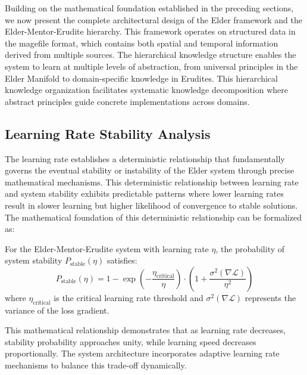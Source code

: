 Building on the mathematical foundation established in the preceding sections, we now present the complete architectural design of the Elder framework and the Elder-Mentor-Erudite hierarchy. This framework operates on structured data in the magefile format, which contains both spatial and temporal information derived from multiple sources. The hierarchical knowledge structure enables the system to learn at multiple levels of abstraction, from universal principles in the Elder Manifold to domain-specific knowledge in Erudites. This hierarchical knowledge organization facilitates systematic knowledge decomposition where abstract principles guide concrete implementations across domains.

\subsection{Learning Rate Stability Analysis}

The learning rate establishes a deterministic relationship that fundamentally governs the eventual stability or instability of the Elder system through precise mathematical mechanisms. This deterministic relationship between learning rate and system stability exhibits predictable patterns where lower learning rates result in slower learning but higher likelihood of convergence to stable solutions. The mathematical foundation of this deterministic relationship can be formalized as:

\begin{theorem}
For the Elder-Mentor-Erudite system with learning rate $\eta$, the probability of system stability $P_{\text{stable}}(\eta)$ satisfies:
\begin{equation}
P_{\text{stable}}(\eta) = 1 - \exp\left(-\frac{\eta_{\text{critical}}}{\eta}\right) \cdot \left(1 + \frac{\sigma^2(\nabla \mathcal{L})}{\eta^2}\right)
\end{equation}
where $\eta_{\text{critical}}$ is the critical learning rate threshold and $\sigma^2(\nabla \mathcal{L})$ represents the variance of the loss gradient.
\end{theorem}

This mathematical relationship demonstrates that as learning rate decreases, stability probability approaches unity, while learning speed decreases proportionally. The system architecture incorporates adaptive learning rate mechanisms to balance this trade-off dynamically.

